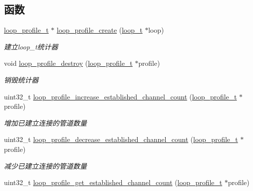 \subsection*{函数}
\begin{DoxyCompactItemize}
\item 
\hyperlink{a00050_ad060e1396346d2f5db1ec0597376a107_ad060e1396346d2f5db1ec0597376a107}{loop\+\_\+profile\+\_\+t} $\ast$ \hyperlink{a00077_adb276ec4e5559b1e167dc9045fa499bb_adb276ec4e5559b1e167dc9045fa499bb}{loop\+\_\+profile\+\_\+create} (\hyperlink{a00050_a9c3ad1cd2de83e09f3a7b59fa82c94ee_a9c3ad1cd2de83e09f3a7b59fa82c94ee}{loop\+\_\+t} $\ast$loop)
\begin{DoxyCompactList}\small\item\em 建立loop\+\_\+t统计器 \end{DoxyCompactList}\item 
void \hyperlink{a00077_a737f9f904afe15e70f56886c44372e5d_a737f9f904afe15e70f56886c44372e5d}{loop\+\_\+profile\+\_\+destroy} (\hyperlink{a00050_ad060e1396346d2f5db1ec0597376a107_ad060e1396346d2f5db1ec0597376a107}{loop\+\_\+profile\+\_\+t} $\ast$profile)
\begin{DoxyCompactList}\small\item\em 销毁统计器 \end{DoxyCompactList}\item 
uint32\+\_\+t \hyperlink{a00077_af388f071a9558df8049c51205d33361a_af388f071a9558df8049c51205d33361a}{loop\+\_\+profile\+\_\+increase\+\_\+established\+\_\+channel\+\_\+count} (\hyperlink{a00050_ad060e1396346d2f5db1ec0597376a107_ad060e1396346d2f5db1ec0597376a107}{loop\+\_\+profile\+\_\+t} $\ast$profile)
\begin{DoxyCompactList}\small\item\em 增加已建立连接的管道数量 \end{DoxyCompactList}\item 
uint32\+\_\+t \hyperlink{a00077_a7cfc0ba3d4b5083413f330b519e38eec_a7cfc0ba3d4b5083413f330b519e38eec}{loop\+\_\+profile\+\_\+decrease\+\_\+established\+\_\+channel\+\_\+count} (\hyperlink{a00050_ad060e1396346d2f5db1ec0597376a107_ad060e1396346d2f5db1ec0597376a107}{loop\+\_\+profile\+\_\+t} $\ast$profile)
\begin{DoxyCompactList}\small\item\em 减少已建立连接的管道数量 \end{DoxyCompactList}\item 
uint32\+\_\+t \hyperlink{a00077_a45226aca5f27c8d49cc7b405409fc958_a45226aca5f27c8d49cc7b405409fc958}{loop\+\_\+profile\+\_\+get\+\_\+established\+\_\+channel\+\_\+count} (\hyperlink{a00050_ad060e1396346d2f5db1ec0597376a107_ad060e1396346d2f5db1ec0597376a107}{loop\+\_\+profile\+\_\+t} $\ast$profile)

\end{DoxyCompactItemize}
